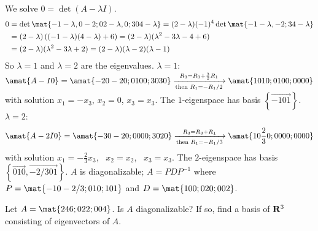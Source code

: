 \begin{problems}
\begin{solution}
  \begin{subproblems}
    \subproblem We solve $0=\det(A-\lambda I)$.
    \begin{align*}
      0 & = \det\mat{-1-\lambda, 0 -2; 0 2-\lambda, 0; 3 0 4-\lambda} =
          (2-\lambda)(-1)^{4} \det\mat{-1-\lambda, -2; 3 4-\lambda} 
      \\ & =(2-\lambda)\left((-1-\lambda)(4-\lambda) + 6\right)
           = (2-\lambda)(\lambda^2-3\lambda -4+6) 
      \\ & = (2-\lambda)(\lambda^2-3\lambda+2)
           = (2-\lambda)(\lambda-2)(\lambda-1)
    \end{align*}
    So $\lambda = 1$ and $\lambda = 2$ are the eigenvalues.\newline
    \newline \underline{$\lambda = 1$}:
    $\amat{A-I 0} = \amat{-2 0 -2 0; 0 1 0 0; 3 0 3 0}
    \xrightarrow[\textup{then } R_1 = -R_1
    /2]{R_3=R_3+\frac{3}{2}R_1}\amat{1 0 1 0; 0 1 0 0; 0 0 0 0}$ with
    solution $x_1= -x_3$, $x_2=0$, $x_3=x_3$.  The $1$-eigenspace has
    basis $\left\{ \vec{-1 0 1} \right\}$.  \newline \newline
    \underline{$\lambda = 2$}:
      \[\amat{A-2I 0} = \amat{-3 0 -2 0; 0 0 0 0; 3 0 2 0} 
        \xrightarrow[\textup{then } R_1= -R_1/3]{R_3=R_3+R_1} \amat{1
          0 \frac{2}{3} 0; 0 0 0 0; 0 0 0 0}\] with solution
      $x_1= -\frac{2}{3}x_3$, \ $x_2=x_2$, \ $x_3=x_3$.  The
      $2$-eigenspace has basis
      $\left\{ \vec{0 1 0}, \vec{-2/3 0 1}\right\}$.
      \newline %
      \subproblem $A$ is diagonalizable; $A=PDP^{-1}$ where
      $P = \mat{-1 0 -2/3; 0 1 0; 1 0 1}$ and
      $D= \mat{1 0 0; 0 2 0; 0 0 2}$.
    \end{subproblems}
\end{solution}



\problem %
Let $A = \mat{2 4 6; 0 2 2; 0 0 4}$.  Is $A$ diagonalizable?
If so, find a basis of ${\bf R}^3$ consisting of eigenvectors of $A$.


\end{problems}
